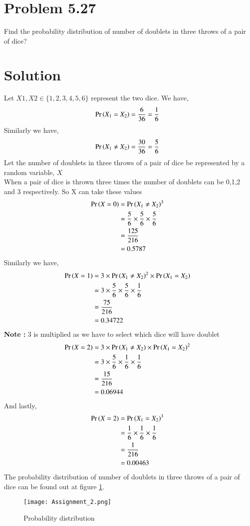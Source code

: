 \documentclass[journal,12pt,twocolumn]{IEEEtran}
\begin{document}
\section*{Problem 5.27}
Find the probability distribution of number of doublets in three throws of a pair of dice?
\section*{Solution}
Let $X1, X2 \in \{1, 2, 3, 4, 5, 6\}$ represent the two dice.
We have,
$$\Pr\left(X_1 =X_2\right) = \frac{6}{36} = \frac{1}{6}$$
Similarly we have, 
$$\Pr\left(X_1 \neq X_2\right) = \frac{30}{36} = \frac{5}{6}$$
Let the number of doublets in three throws of a pair of dice be represented by a random variable, $X$ \\
When a pair of dice is thrown three times the number of doublets can be 0,1,2 and 3 respectively. So X can take these values
\begin{align}
    \Pr\left(X =0\right) &= {\Pr\left(X_1 \neq X_2\right)}^3   \\
        &=  \frac{5}{6} \times \frac{5}{6} \times \frac{5}{6} \\
        & = \frac{125}{216} \\
        & = 0.5787
\end{align}
Similarly we have, 
\begin{align}
    \Pr\left(X =1\right) &= 3 \times {\Pr\ensuremath{\left(X_1 \neq X_2\right)}}^2 \times \Pr\left(X_1 = X_2\right)   \\
        &=  3\times \frac{5}{6} \times \frac{5}{6} \times \frac{1}{6} \\
        & = \frac{75}{216} \\
        & = 0.34722
\end{align}
\textbf{Note :} 3 is multiplied as we have to select which dice will have doublet
\begin{align}
    \Pr\left(X =2\right) &= 3 \times \Pr\left(X_1 \neq X_2\right) \times {\Pr\ensuremath{\left(X_1 = X_2\right)}}^2 \\
        &=  3\times \frac{5}{6} \times \frac{1}{6} \times \frac{1}{6} \\
        & = \frac{15}{216} \\
        & = 0.06944
\end{align}
And lastly,
\begin{align}
    \Pr\left(X =2\right) &= {\Pr\left(X_1 = X_2\right)}^3   \\
        &=   \frac{1}{6} \times \frac{1}{6} \times \frac{1}{6} \\
        & = \frac{1}{216} \\
        & = 0.00463
\end{align}
The probability distribution of number of doublets in three throws of a pair of dice can be found out at figure \ref{Probability distribution}. 
\begin{figure}[h!]
    \centering
    \texttt{[image: Assignment\_2.png]}
    \caption{Probability distribution}
    \label{Probability distribution}
\end{figure}
\end{document}
